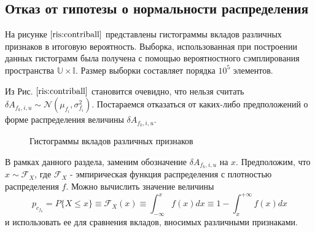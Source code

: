 \documentclass[12pt,a4paper]{report}
\begin{document}
\subsection{Отказ от гипотезы о нормальности распределения}
На рисунке $\ref{ris:contriball}$ представлены гистограммы вкладов различных признаков в итоговую вероятность. Выборка, использованная при построении данных гистограмм была получена с помощью вероятностного сэмплирования пространства $\mathbb{U} \times \mathbb{I}$. Размер выборки составляет порядка $10^5$ элементов.

Из Рис. $\ref{ris:contriball}$ становится очевидно, что нельзя считать $\delta A_{f_k, i, u} \sim \mathcal{N}(\mu_{f_i}, \sigma_{f_i}^2)$. Постараемся отказаться от каких-либо предположений о форме распределения величины $\delta A_{f_k, i, u}$.

\begin{figure}[pH]
\begin{minipage}[h]{0.49\linewidth}
\end{minipage}
\hfill
\begin{minipage}[h]{0.49\linewidth}
\end{minipage}
\begin{minipage}[h]{1.\linewidth}
\end{minipage}
\caption{Гистограммы вкладов различных признаков}
\label{ris:contriball}
\end{figure}

В рамках данного раздела, заменим обозначение $\delta A_{f_k, i, u}$ на $x$.
Предположим, что $x \sim \mathcal{F}_{X}$, где $\mathcal{F}_{X}$ - эмпирическая функция распределения с плотностью распределения $f$. Можно вычислить значение величины 
\begin{equation*}
p_{c_{f_k}} = \textit{P}\{X \le x\} \equiv \mathcal{F}_X(x) \equiv \int_{-\infty}^{x}f(x)dx \equiv 1 - \int_{x}^{+\infty}f(x)dx
\end{equation*}
и использовать ее для сравнения вкладов, вносимых различными признаками.
\end{document}
